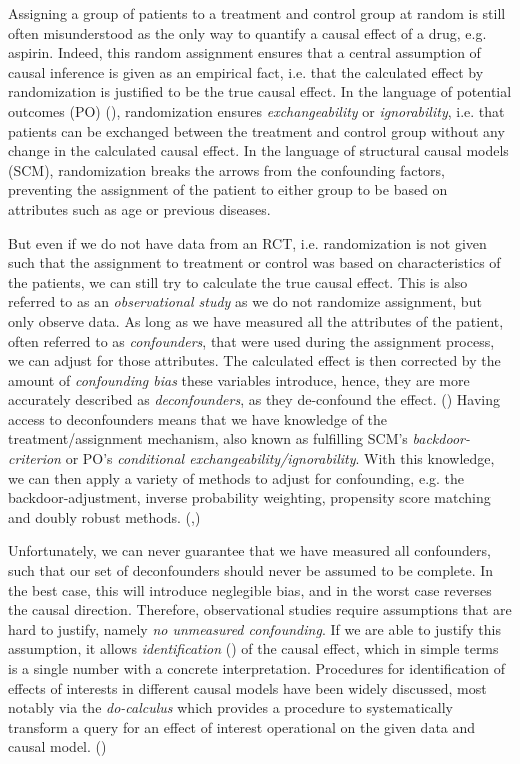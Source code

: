 \documentclass{article}
\begin{document}
Assigning a group of patients to a treatment and control group at random is still often misunderstood as the only way to quantify a causal effect of a drug, e.g. aspirin. Indeed, this random assignment ensures that a central assumption of causal inference is given as an empirical fact, i.e. that the calculated effect by randomization is justified to be the true causal effect. In the language of potential outcomes (PO) (\cite{hernan2020causal}), randomization ensures \textit{exchangeability} or \textit{ignorability}, i.e. that patients can be exchanged between the treatment and control group without any change in the calculated causal effect. In the language of structural causal models (SCM), randomization breaks the arrows from the confounding factors, preventing the assignment of the patient to either group to be based on attributes such as age or previous diseases. 

But even if we do not have data from an RCT, i.e. randomization is not given such that the assignment to treatment or control was based on characteristics of the patients, we can still try to calculate the true causal effect. This is also referred to as an \textit{observational study} as we do not randomize assignment, but only observe data. As long as we have measured all the attributes of the patient, often referred to as \textit{confounders}, that were used during the assignment process, we can adjust for those attributes. The calculated effect is then corrected by the amount of \textit{confounding bias} these variables introduce, hence, they are more accurately described as \textit{deconfounders}, as they de-confound the effect. (\cite{dawid2015statistical}) Having access to deconfounders means that we have knowledge of the treatment/assignment mechanism, also known as fulfilling SCM's \textit{backdoor-criterion}  or PO's \textit{conditional exchangeability/ignorability}. With this knowledge, we can then apply a variety of methods to adjust for confounding, e.g. the backdoor-adjustment, inverse probability weighting, propensity score matching and doubly robust methods. (\cite{pearl2009causality},\cite{hernan2020causal})

Unfortunately, we can never guarantee that we have measured all confounders, such that our set of deconfounders should never be assumed to be complete. In the best case, this will introduce neglegible bias, and in the worst case reverses the causal direction. Therefore, observational studies require assumptions that are hard to justify, namely \textit{no unmeasured confounding}. If we are able to justify this assumption, it allows \textit{identification} (\cite{pearl2012robustness}) of the causal effect, which in simple terms is a single number with a concrete interpretation. Procedures for identification of effects of interests in different causal models have been widely discussed, most notably via the \textit{do-calculus} which provides a procedure to systematically transform a query for an effect of interest operational on the given data and causal model. (\cite{pearl2009causality})
\end{document}
